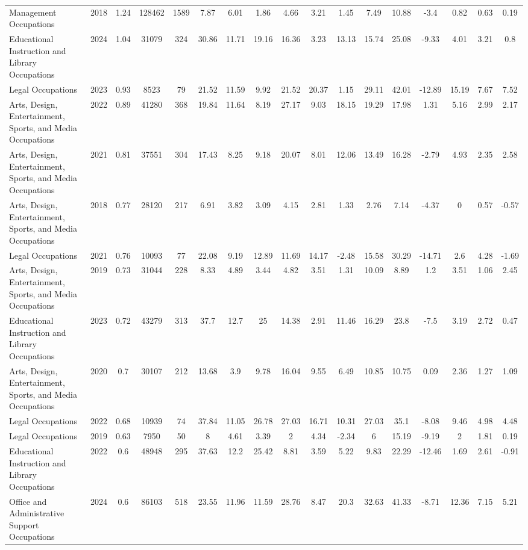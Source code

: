 \begin{landscape}
\begin{table}[htbp]
\begin{tabular}{lcccccccccccccccc}
Management Occupations & 2018 & 1.24 & 128462 & 1589 & 7.87 & 6.01 & 1.86 & 4.66 & 3.21 & 1.45 & 7.49 & 10.88 & -3.4 & 0.82 & 0.63 & 0.19 \\
Educational Instruction and Library Occupations & 2024 & 1.04 & 31079 & 324 & 30.86 & 11.71 & 19.16 & 16.36 & 3.23 & 13.13 & 15.74 & 25.08 & -9.33 & 4.01 & 3.21 & 0.8 \\
Legal Occupations & 2023 & 0.93 & 8523 & 79 & 21.52 & 11.59 & 9.92 & 21.52 & 20.37 & 1.15 & 29.11 & 42.01 & -12.89 & 15.19 & 7.67 & 7.52 \\
Arts, Design, Entertainment, Sports, and Media Occupations & 2022 & 0.89 & 41280 & 368 & 19.84 & 11.64 & 8.19 & 27.17 & 9.03 & 18.15 & 19.29 & 17.98 & 1.31 & 5.16 & 2.99 & 2.17 \\
Arts, Design, Entertainment, Sports, and Media Occupations & 2021 & 0.81 & 37551 & 304 & 17.43 & 8.25 & 9.18 & 20.07 & 8.01 & 12.06 & 13.49 & 16.28 & -2.79 & 4.93 & 2.35 & 2.58 \\
Arts, Design, Entertainment, Sports, and Media Occupations & 2018 & 0.77 & 28120 & 217 & 6.91 & 3.82 & 3.09 & 4.15 & 2.81 & 1.33 & 2.76 & 7.14 & -4.37 & 0 & 0.57 & -0.57 \\
Legal Occupations & 2021 & 0.76 & 10093 & 77 & 22.08 & 9.19 & 12.89 & 11.69 & 14.17 & -2.48 & 15.58 & 30.29 & -14.71 & 2.6 & 4.28 & -1.69 \\
Arts, Design, Entertainment, Sports, and Media Occupations & 2019 & 0.73 & 31044 & 228 & 8.33 & 4.89 & 3.44 & 4.82 & 3.51 & 1.31 & 10.09 & 8.89 & 1.2 & 3.51 & 1.06 & 2.45 \\
Educational Instruction and Library Occupations & 2023 & 0.72 & 43279 & 313 & 37.7 & 12.7 & 25 & 14.38 & 2.91 & 11.46 & 16.29 & 23.8 & -7.5 & 3.19 & 2.72 & 0.47 \\
Arts, Design, Entertainment, Sports, and Media Occupations & 2020 & 0.7 & 30107 & 212 & 13.68 & 3.9 & 9.78 & 16.04 & 9.55 & 6.49 & 10.85 & 10.75 & 0.09 & 2.36 & 1.27 & 1.09 \\
Legal Occupations & 2022 & 0.68 & 10939 & 74 & 37.84 & 11.05 & 26.78 & 27.03 & 16.71 & 10.31 & 27.03 & 35.1 & -8.08 & 9.46 & 4.98 & 4.48 \\
Legal Occupations & 2019 & 0.63 & 7950 & 50 & 8 & 4.61 & 3.39 & 2 & 4.34 & -2.34 & 6 & 15.19 & -9.19 & 2 & 1.81 & 0.19 \\
Educational Instruction and Library Occupations & 2022 & 0.6 & 48948 & 295 & 37.63 & 12.2 & 25.42 & 8.81 & 3.59 & 5.22 & 9.83 & 22.29 & -12.46 & 1.69 & 2.61 & -0.91 \\
Office and Administrative Support Occupations & 2024 & 0.6 & 86103 & 518 & 23.55 & 11.96 & 11.59 & 28.76 & 8.47 & 20.3 & 32.63 & 41.33 & -8.71 & 12.36 & 7.15 & 5.21 \\

\end{tabular}
\end{table}
\end{landscape}
